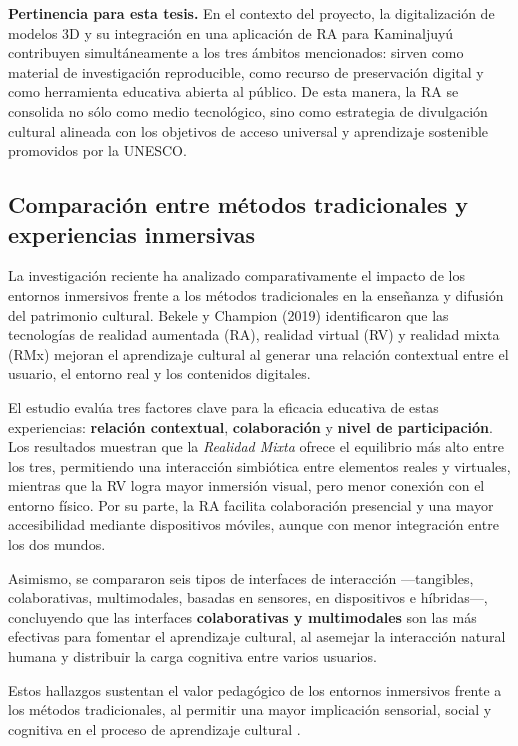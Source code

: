 \textbf{Pertinencia para esta tesis.} En el contexto del proyecto, la digitalización de modelos 3D y su integración en una aplicación de RA para Kaminaljuyú contribuyen simultáneamente a los tres ámbitos mencionados: sirven como material de investigación reproducible, como recurso de preservación digital y como herramienta educativa abierta al público. De esta manera, la RA se consolida no sólo como medio tecnológico, sino como estrategia de divulgación cultural alineada con los objetivos de acceso universal y aprendizaje sostenible promovidos por la UNESCO.

\subsection*{Comparación entre métodos tradicionales y experiencias inmersivas}

La investigación reciente ha analizado comparativamente el impacto de los entornos inmersivos frente a los métodos tradicionales en la enseñanza y difusión del patrimonio cultural. Bekele y Champion (2019) identificaron que las tecnologías de realidad aumentada (RA), realidad virtual (RV) y realidad mixta (RMx) mejoran el aprendizaje cultural al generar una relación contextual entre el usuario, el entorno real y los contenidos digitales. 

El estudio evalúa tres factores clave para la eficacia educativa de estas experiencias: \textbf{relación contextual}, \textbf{colaboración} y \textbf{nivel de participación}. Los resultados muestran que la \textit{Realidad Mixta} ofrece el equilibrio más alto entre los tres, permitiendo una interacción simbiótica entre elementos reales y virtuales, mientras que la RV logra mayor inmersión visual, pero menor conexión con el entorno físico. Por su parte, la RA facilita colaboración presencial y una mayor accesibilidad mediante dispositivos móviles, aunque con menor integración entre los dos mundos.

Asimismo, se compararon seis tipos de interfaces de interacción —tangibles, colaborativas, multimodales, basadas en sensores, en dispositivos e híbridas—, concluyendo que las interfaces \textbf{colaborativas y multimodales} son las más efectivas para fomentar el aprendizaje cultural, al asemejar la interacción natural humana y distribuir la carga cognitiva entre varios usuarios.

Estos hallazgos sustentan el valor pedagógico de los entornos inmersivos frente a los métodos tradicionales, al permitir una mayor implicación sensorial, social y cognitiva en el proceso de aprendizaje cultural \cite{Bekele2019ImmersiveComparison}.

